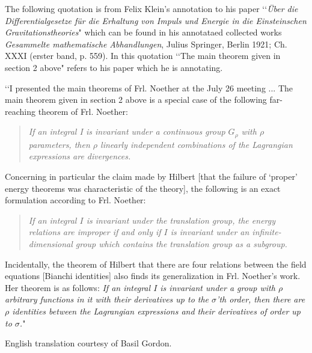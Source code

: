 \documentclass[12pt]{article}
\begin{document}

\noindent
The following quotation is from Felix Klein's annotation to his paper \lq\lq{\it{\"{U}ber die Differentialgesetze f\"{u}r
die Erhaltung von Impuls und Energie in die Einsteinschen
Gravitationstheories}}" \cite{kleinpap} which can be found in his
annotataed collected works 
 {\it{Gesammelte mathematische Abhandlungen}}, Julius Springer, Berlin 1921;
Ch. XXXI (erster band, p. 559).  In this quotation 
  \lq\lq The main theorem given in section 2 above" refers to his  paper which he is annotating.


\lq\lq I presented the main theorems of Frl.  Noether at the July 26 meeting ...
The main theorem given in section 2 above is a special case of the following
far-reaching theorem of Frl. Noether:
\begin{quote}
{\it{ If an integral I
is invariant under a continuous group $G_\rho$ with $\rho$ parameters, then
$\rho$ linearly independent combinations of the Lagrangian expressions are
divergences.}}   
\end{quote}
Concerning in particular the claim made by Hilbert
[that the failure of `proper' energy theorems was  characteristic
  of the theory], the following is an exact formulation
according to Frl.  Noether:  
\begin{quote}{\it{ If an integral $I$ is invariant under
the translation group, the energy relations are improper if and only if $I$ is
invariant under an infinite-dimensional group which contains the translation
group as a subgroup.  }} 
\end{quote}
Incidentally, the theorem of Hilbert that
there are four relations between the field equations 
[Bianchi identities]
also finds its
generalization in Frl.  Noether's work.  Her theorem is as follows:
{\it{ If an integral $I$ is invariant under a group with $\rho$
arbitrary functions in it with their derivatives up to the $\sigma$'th order,
then there are $\rho$ identities between the Lagrangian expressions and their
derivatives of order up to $\sigma$.}}" 

\noindent
English translation courtesy of Basil Gordon. 
\end{document}
